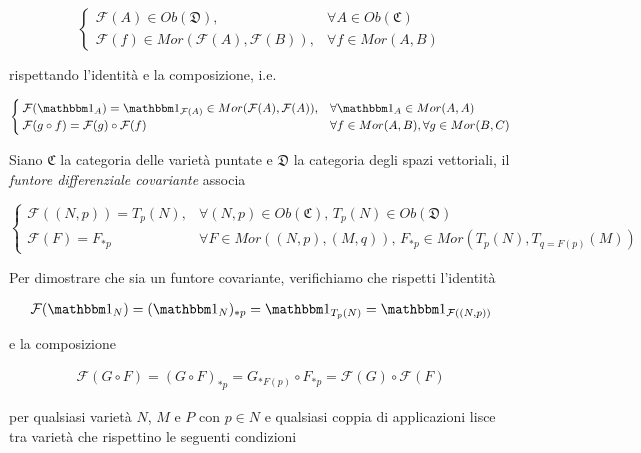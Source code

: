 \begin{equation}
	\begin{cases}
		\mathcal{F}(A) \in Ob(\mathfrak{D}), & \forall A \in Ob(\mathfrak{C})\\
		\mathcal{F}(f) \in Mor(\mathcal{F}(A),\mathcal{F}(B)), & \forall f \in Mor(A,B)
	\end{cases}
\end{equation}

rispettando l'identità e la composizione, i.e.

\begin{equation}
	\begin{cases}
		\mathcal{F}(\bigone_{A}) = \bigone_{\mathcal{F}(A)} \in Mor(\mathcal{F}(A),\mathcal{F}(A)), & \forall \bigone_{A} \in Mor(A,A)\\
		\mathcal{F}(g \circ f) = \mathcal{F}(g) \circ \mathcal{F}(f) & \forall f \in Mor(A,B), \forall g \in Mor(B,C)
	\end{cases}
\end{equation}

Siano $ \mathfrak{C} $ la categoria delle varietà puntate e $ \mathfrak{D} $ la categoria degli spazi vettoriali, il \textit{funtore differenziale covariante} associa

\begin{equation}
	\begin{cases}
		\mathcal{F}((N,p)) = T_{p}(N), & \forall (N,p) \in Ob(\mathfrak{C}), \, T_{p}(N) \in Ob(\mathfrak{D})\\
		\mathcal{F}(F) = F_{*p} & \forall F \in Mor((N,p),(M,q)), \, F_{*p} \in Mor(T_{p}(N),T_{q=F(p)}(M))
	\end{cases}
\end{equation}

Per dimostrare che sia un funtore covariante, verifichiamo che rispetti l'identità

\begin{align}
	\mathcal{F}(\bigone_{N}) = (\bigone_{N})_{*p} %
	= \bigone_{T_{p}(N)} %
	= \bigone_{\mathcal{F}((N,p))}
\end{align}

e la composizione

\begin{align}
	\mathcal{F}(G \circ F) = (G \circ F)_{*p} %
	= G_{*F(p)} \circ F_{*p} %
	= \mathcal{F}(G) \circ \mathcal{F}(F)
\end{align}

per qualsiasi varietà $ N $, $ M $ e $ P $ con $ p \in N $ e qualsiasi coppia di applicazioni lisce tra varietà che rispettino le seguenti condizioni

